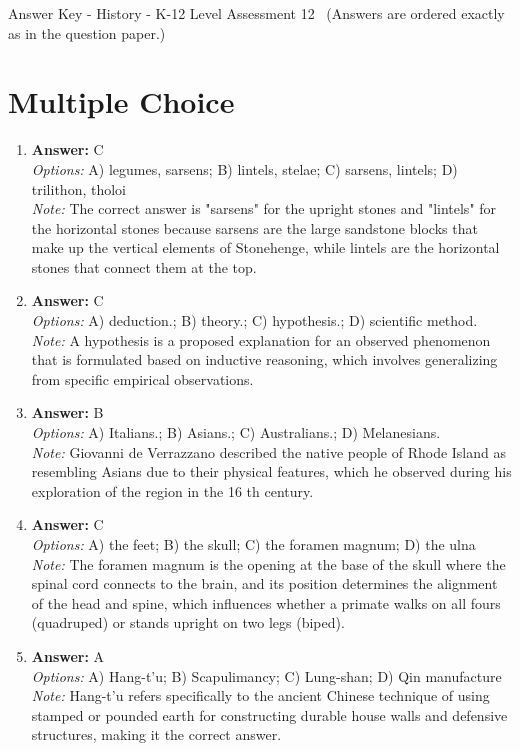 \documentclass[12pt]{article}
\begin{document}
\begin{center}
Answer Key - History - K-12 Level Assessment 12 \
\small (Answers are ordered exactly as in the question paper.)
\end{center}

\section*{Multiple Choice}
\begin{enumerate}[label=\arabic*.]
\item \textbf{Answer:} C
\\ \textit{Options:} A) legumes, sarsens; B) lintels, stelae; C) sarsens, lintels; D) trilithon, tholoi
\\ \textit{Note:} The correct answer is "sarsens" for the upright stones and "lintels" for the horizontal stones because sarsens are the large sandstone blocks that make up the vertical elements of Stonehenge, while lintels are the horizontal stones that connect them at the top.
\item \textbf{Answer:} C
\\ \textit{Options:} A) deduction.; B) theory.; C) hypothesis.; D) scientific method.
\\ \textit{Note:} A hypothesis is a proposed explanation for an observed phenomenon that is formulated based on inductive reasoning, which involves generalizing from specific empirical observations.
\item \textbf{Answer:} B
\\ \textit{Options:} A) Italians.; B) Asians.; C) Australians.; D) Melanesians.
\\ \textit{Note:} Giovanni de Verrazzano described the native people of Rhode Island as resembling Asians due to their physical features, which he observed during his exploration of the region in the 16 th century.
\item \textbf{Answer:} C
\\ \textit{Options:} A) the feet; B) the skull; C) the foramen magnum; D) the ulna
\\ \textit{Note:} The foramen magnum is the opening at the base of the skull where the spinal cord connects to the brain, and its position determines the alignment of the head and spine, which influences whether a primate walks on all fours (quadruped) or stands upright on two legs (biped).
\item \textbf{Answer:} A
\\ \textit{Options:} A) Hang-t'u; B) Scapulimancy; C) Lung-shan; D) Qin manufacture
\\ \textit{Note:} Hang-t'u refers specifically to the ancient Chinese technique of using stamped or pounded earth for constructing durable house walls and defensive structures, making it the correct answer.
\end{enumerate}
\end{document}
